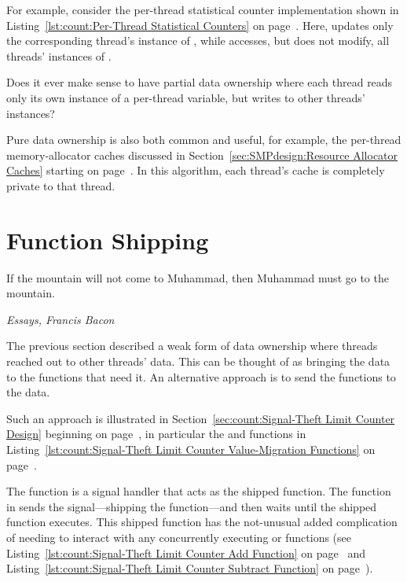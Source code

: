 For example, consider the per-thread statistical counter implementation
shown in
Listing~\ref{lst:count:Per-Thread Statistical Counters} on
page~\pageref{lst:count:Per-Thread Statistical Counters}.
Here,  updates only the corresponding thread's
instance of ,
while  accesses, but does not modify, all
threads' instances of .

\QuickQuiz{}
	Does it ever make sense to have partial data ownership where
	each thread reads only its own instance of a per-thread variable,
	but writes to other threads' instances?
 \QuickQuizEnd

Pure data ownership is also both common and useful, for example, the
per-thread memory-allocator caches discussed in
Section~\ref{sec:SMPdesign:Resource Allocator Caches}
starting on
page~\pageref{sec:SMPdesign:Resource Allocator Caches}.
In this algorithm, each thread's cache is completely private to that
thread.

\section{Function Shipping}
\label{sec:owned:Function Shipping}
%
\epigraph{If the mountain will not come to Muhammad, then Muhammad must
	  go to the mountain.}
	 {\emph{Essays, Francis Bacon}}

The previous section described a weak form of data ownership where
threads reached out to other threads' data.
This can be thought of as bringing the data to the functions that
need it.
An alternative approach is to send the functions to the data.

Such an approach is illustrated in
Section~\ref{sec:count:Signal-Theft Limit Counter Design}
beginning on
page~\pageref{sec:count:Signal-Theft Limit Counter Design},
in particular the  and
 functions in
Listing~\ref{lst:count:Signal-Theft Limit Counter Value-Migration Functions}
on
page~\pageref{lst:count:Signal-Theft Limit Counter Value-Migration Functions}.

The  function is a signal handler that
acts as the shipped function.
The  function in 
sends the signal---shipping the function---and then waits until
the shipped function executes.
This shipped function has the not-unusual added complication of
needing to interact with any concurrently executing 
or  functions (see
Listing~\ref{lst:count:Signal-Theft Limit Counter Add Function}
on
page~\pageref{lst:count:Signal-Theft Limit Counter Add Function} and
Listing~\ref{lst:count:Signal-Theft Limit Counter Subtract Function}
on
page~\pageref{lst:count:Signal-Theft Limit Counter Subtract Function}).

